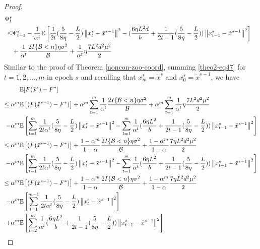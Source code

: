 \documentclass{article}
\newcommand*{\E}{\mathbb{E}}
\newcommand{\norm}[1]{\left\lVert#1\right\rVert}
\theoremstyle{definition}
\theoremstyle{remark}
\begin{document}
\begin{proof}
\begin{align} 
\Psi_t^s \notag
\\ \leq& \Psi_{t-1}^s - \frac{1}{\alpha^t}\E\left[ \frac{1}{2t}(\frac{5}{8\eta} - \frac{L}{2})\norm{{x}_t^s-\tilde{x}^{s-1}}^2-(\frac{6\eta L^2 d}{b}+\frac{1}{2t-1}(\frac{5}{8\eta} - \frac{L}{2}))\norm{x_{t-1}^s-\tilde{x}^{s-1}}^2\right]\notag\\
&+ \frac{1}{\alpha^t}\frac{2I\{\mathcal{B} < n\}\eta \sigma ^2}{\mathcal{B}}+\frac{1}{\alpha^t}\eta \frac{7 L^2 d^2 \mu^2}{2}\label{theo2-eq47}
 \end{align}
Similar to the proof of Theorem \ref{noncon-zoo-coord}, summing \eqref{theo2-eq47} for $t=1, 2, \ldots, m$ in epoch $s$ and recalling that $x_m^s = \tilde{x}^s$ and $x_0^s = \tilde{x}^{s-1}$, we have 
\begin{align}
\E&[F(\tilde{x}^s)-F^*]\notag\\
\leq\alpha^m\E&\left[(F(\tilde{x}^{s-1}) - F^*)\right] +\alpha^m\sum_{t=1}^m \frac{1}{\alpha^t}\frac{2I\{\mathcal{B} < n\}\eta \sigma ^2}{\mathcal{B}}+\alpha^m\sum_{t=1}^m \frac{1}{\alpha^t}\eta \frac{7 L^2 d^2 \mu^2}{2}\notag
\\-\alpha^m\E&\left[\sum_{t=1}^m\frac{1}{2t\alpha^t}(\frac{5}{8\eta} - \frac{L}{2})\norm{{x}_t^s-\tilde{x}^{s-1}}^2-\sum_{t=1}^m\frac{1}{\alpha^t}(\frac{6 \eta L^2 }{b}+\frac{1}{2t-1}(\frac{5}{8\eta} - \frac{L}{2})) \norm{x_{t-1}^s-\tilde{x}^{s-1}}^2 \right]\notag\\
\leq\alpha^m\E&\left[(F(\tilde{x}^{s-1}) - F^*)\right] + \frac{1-\alpha^m}{1-\alpha}\frac{2I\{\mathcal{B} < n\}\eta \sigma ^2}{\mathcal{B}}+\frac{1-\alpha^m}{1-\alpha} \frac{7 \eta L^2 d^2 \mu^2}{2}\notag
\\-\alpha^m\E&\left[\sum_{t=1}^m\frac{1}{2t\alpha^t}(\frac{5}{8\eta} - \frac{L}{2})\norm{{x}_t^s-\tilde{x}^{s-1}}^2-\sum_{t=1}^m\frac{1}{\alpha^t}(\frac{6\eta L^2 }{b}+\frac{1}{2t-1}(\frac{5}{8\eta} - \frac{L}{2})) \norm{x_{t-1}^s-\tilde{x}^{s-1}}^2 \right]\notag\\
\leq\alpha^m\E&\left[(F(\tilde{x}^{s-1}) - F^*)\right] + \frac{1-\alpha^m}{1-\alpha}\frac{2I\{\mathcal{B} < n\}\eta \sigma ^2}{\mathcal{B}}+\frac{1-\alpha^m}{1-\alpha}\frac{7 \eta L^2 d^2 \mu^2}{2}\notag
\\-\alpha^m\E&\left[\sum_{t=1}^{m-1}\frac{1}{2t\alpha^t}(\frac{5}{8\eta} - \frac{L}{2})\norm{{x}_t^s-\tilde{x}^{s-1}}^2\right]\notag\\
+\alpha^m\E&\left[\sum_{t=2}^m\frac{1}{\alpha^t}(\frac{6\eta L^2}{b}+\frac{1}{2t-1}(\frac{5}{8\eta} - \frac{L}{2})) \norm{x_{t-1}^s-\tilde{x}^{s-1}}^2 \right]\label{eq48}\\

\end{align}
\end{proof}
\end{document}
